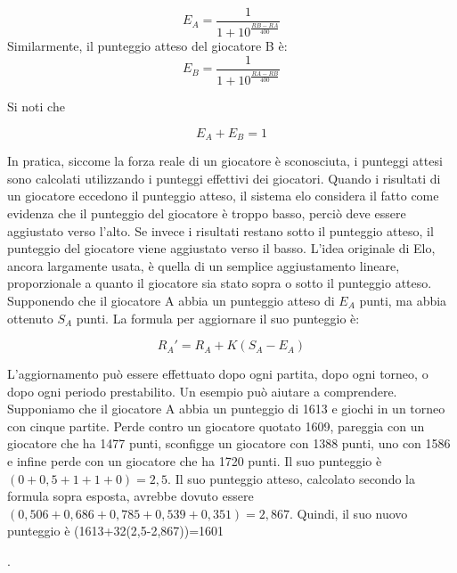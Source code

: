\begin{equation}  E_{A}={\frac{{1}}{{1+10^\frac{{{RB} - {RA}}}{{400}}}}} \end{equation}
Similarmente, il punteggio atteso del giocatore B è:
\begin{equation}  E_{B}={\frac{{1}}{{1+10^\frac{{{RA} - {RB}}}{{400}}}}} \end{equation}

Si noti che {\begin{equation}E_{A} +  E_{B}=1 \end{equation}

In pratica, siccome la forza reale di un giocatore è sconosciuta, i punteggi attesi sono calcolati utilizzando i punteggi effettivi dei giocatori. Quando i risultati di un giocatore eccedono il punteggio atteso,
il sistema elo considera il fatto come evidenza che il punteggio del giocatore è troppo basso, perciò deve essere aggiustato verso l'alto. Se invece i risultati restano sotto il punteggio atteso, 
il punteggio del giocatore viene aggiustato verso il basso. L'idea originale di Elo, ancora largamente usata, è quella di un semplice aggiustamento lineare, proporzionale a quanto il giocatore sia stato
sopra o sotto il punteggio atteso. 
Supponendo che il giocatore A abbia un punteggio atteso di ${E_{A}}$ punti, ma abbia ottenuto ${S_{A}}$ punti. La formula per aggiornare il suo punteggio è:

\begin{equation} R_{A}' =R_{A}+K(S_{A}-E_{A})\end{equation}

L'aggiornamento può essere effettuato dopo ogni partita, dopo ogni torneo, o dopo ogni periodo prestabilito. Un esempio può aiutare a comprendere. Supponiamo che il giocatore A abbia un punteggio di 1613 
e giochi in un torneo con cinque partite. Perde contro un giocatore quotato 1609, pareggia con un giocatore che ha 1477 punti, sconfigge un giocatore con 1388 punti, uno con 1586 e infine perde con un giocatore 
che ha 1720 punti. Il suo punteggio è $ {(0+0,5+1+1+0)=2,5}$. Il suo punteggio atteso, calcolato secondo la formula sopra esposta, avrebbe dovuto essere 
$ (0,506+0,686+0,785+0,539+0,351)=2,867 $. Quindi, il suo nuovo punteggio è (1613+32(2,5-2,867))=1601} \cite{itwiki:125247032}.

